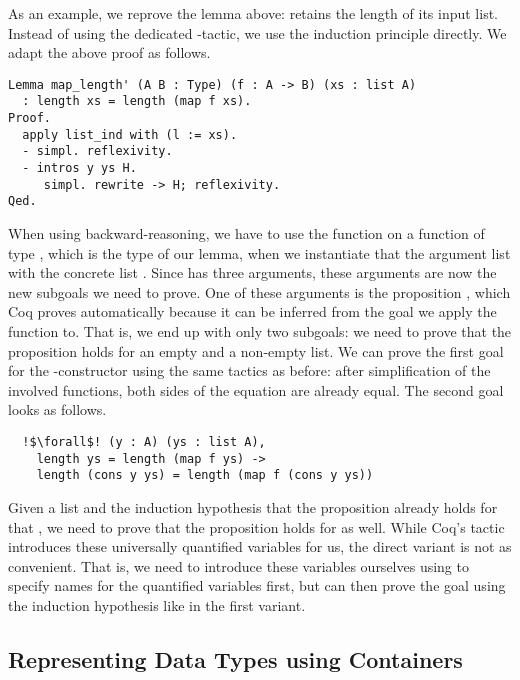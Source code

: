 As an example, we reprove the lemma above:  retains the length of its input list.
Instead of using the dedicated -tactic, we use the induction principle directly.
We adapt the above proof as follows.

\begin{verbatim}
Lemma map_length' (A B : Type) (f : A -> B) (xs : list A)
  : length xs = length (map f xs).
Proof.
  apply list_ind with (l := xs).
  - simpl. reflexivity.
  - intros y ys H.
     simpl. rewrite -> H; reflexivity.
Qed.
\end{verbatim}

When using backward-reasoning, we have to use the function  on a function of type , which is the type of our lemma, when we instantiate that the argument list  with the concrete list .
Since  has three arguments, these arguments are now the new subgoals we need to prove.
One of these arguments is the proposition , which Coq proves automatically because it can be inferred from the goal we apply the function to.
That is, we end up with only two subgoals: we need to prove that the proposition holds for an empty and a non-empty list.
We can prove the first goal for the -constructor using the same tactics as before: after simplification of the involved functions, both sides of the equation are already equal.
The second goal looks as follows.

\begin{verbatim}
  !$\forall$! (y : A) (ys : list A),
    length ys = length (map f ys) ->
    length (cons y ys) = length (map f (cons y ys))
\end{verbatim}

Given a list  and the induction hypothesis that the proposition already holds for that , we need to prove that the proposition holds for  as well.
While Coq's  tactic introduces these universally quantified variables for us, the direct variant is not as convenient.
That is, we need to introduce these variables ourselves using  to specify names for the quantified variables first, but can then prove the goal using the induction hypothesis like in the first variant.

\subsection{Representing Data Types using Containers}
\label{sub:container}

